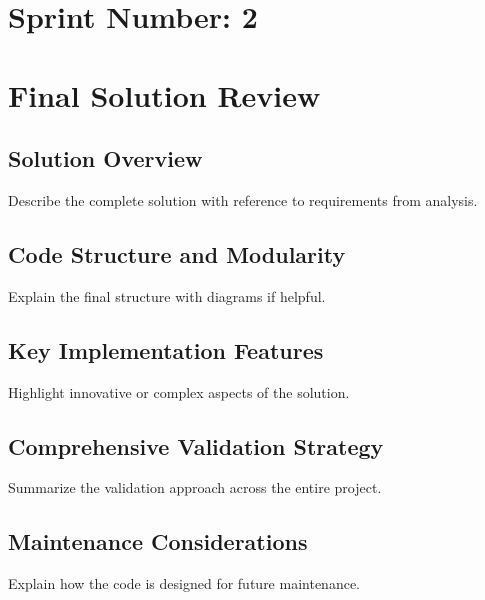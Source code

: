 
\section{Sprint Number: 2}

\section{Final Solution Review}

\subsection{Solution Overview}
Describe the complete solution with reference to requirements from analysis.

\subsection{Code Structure and Modularity}
Explain the final structure with diagrams if helpful.

\subsection{Key Implementation Features}
Highlight innovative or complex aspects of the solution.

\subsection{Comprehensive Validation Strategy}
Summarize the validation approach across the entire project.

\subsection{Maintenance Considerations}
Explain how the code is designed for future maintenance.

